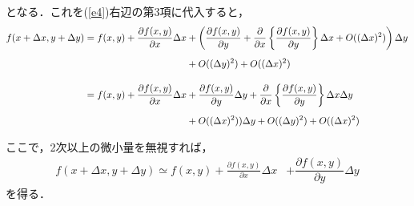 となる．これを(\ref{e4})右辺の第3項に代入すると，
\begin{align}\label{e7}
f(x+\Delta x,y+\Delta y)
=f(x,y)+\frac{\partial f(x,y)}{\partial x}\Delta x&+
\left(\dfrac{\partial f(x,y)}{\partial y}+\frac{\partial }{\partial x}
\left\{
\dfrac{\partial f(x,y)}{\partial y}
\right\}
\Delta x+O((\Delta x)^2)\right)
\Delta y\notag\\[5pt]
&+O((\Delta y)^2)+O((\Delta x)^2)\notag\\[10pt]
%
=f(x,y)+\frac{\partial f(x,y)}{\partial x}\Delta x&+\dfrac{\partial f(x,y)}{\partial y}\Delta y+\frac{\partial }{\partial x}
\left\{
\dfrac{\partial f(x,y)}{\partial y}
\right\}\Delta x\Delta y\notag\\[5pt]
&
+O((\Delta x)^2))\Delta y+O((\Delta y)^2)+O((\Delta x)^2)\notag\\[5pt]
\end{align}
ここで，2次以上の微小量を無視すれば，
%
\begin{align}\label{e8}
f(x+\Delta x,y+\Delta y)
%
\simeq f(x,y)+\frac{\partial f(x,y)}{\partial x}\Delta x&+\dfrac{\partial f(x,y)}{\partial y}\Delta y
\end{align}
を得る．










